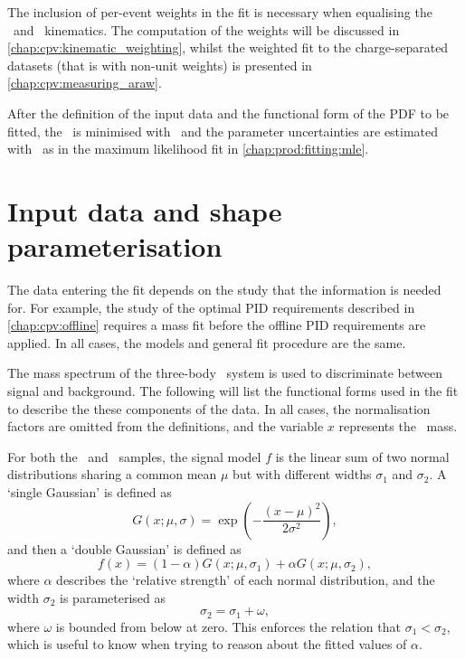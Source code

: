 The inclusion of per-event weights in the fit is necessary when equalising the 
\pKK\ and \ppipi\ kinematics.
The computation of the weights will be discussed in 
\cref{chap:cpv:kinematic_weighting}, whilst the weighted fit to the 
charge-separated datasets (that is with non-unit weights) is presented in 
\cref{chap:cpv:measuring_araw}.

After the definition of the input data and the functional form of the \ac{PDF} 
to be fitted, the \chisq\ is minimised with \minuit\ and the parameter 
uncertainties are estimated with \hesse\ as in the maximum likelihood fit in 
\cref{chap:prod:fitting:mle}.

\section{Input data and shape parameterisation}
\label{chap:cpv:prelim_fits:data_pdfs}

The data entering the fit depends on the study that the information is needed 
for.
For example, the study of the optimal \ac{PID} requirements described in 
\cref{chap:cpv:offline} requires a mass fit before the offline \ac{PID} 
requirements are applied.
In all cases, the models and general fit procedure are the same.

The mass spectrum of the three-body \phh\ system is used to discriminate 
between signal and background.
The following will list the functional forms used in the fit to describe the 
these components of the data.
In all cases, the normalisation factors are omitted from the definitions, and 
the variable $x$ represents the \PLambdac\ mass.

For both the \pKK\ and \ppipi\ samples, the signal model $f$ is the linear sum 
of two normal distributions sharing a common mean $\mu$ but with different 
widths $\sigma_{1}$ and $\sigma_{2}$.
A `single Gaussian' is defined as
\begin{equation}
  G(x; \mu, \sigma) = \exp\left(-\frac{{(x - \mu)}^{2}}{2\sigma^{2}}\right),
\end{equation}
and then a `double Gaussian' is defined as
\begin{equation}
  f(x) = (1 - \alpha)G(x; \mu, \sigma_{1}) + \alpha{}G(x; \mu, \sigma_{2}),
  \label{eqn:cpv:prelim_fits:sig_model}
\end{equation}
where $\alpha$ describes the `relative strength' of each normal distribution, 
and the width $\sigma_{2}$ is parameterised as
\begin{equation}
  \sigma_{2} = \sigma_{1} + \omega,
  \label{eqn:cpv:prelim_fits:sigma2_def}
\end{equation}
where $\omega$ is bounded from below at zero.
This enforces the relation that $\sigma_{1} < \sigma_{2}$, which is useful to 
know when trying to reason about the fitted values of $\alpha$.

